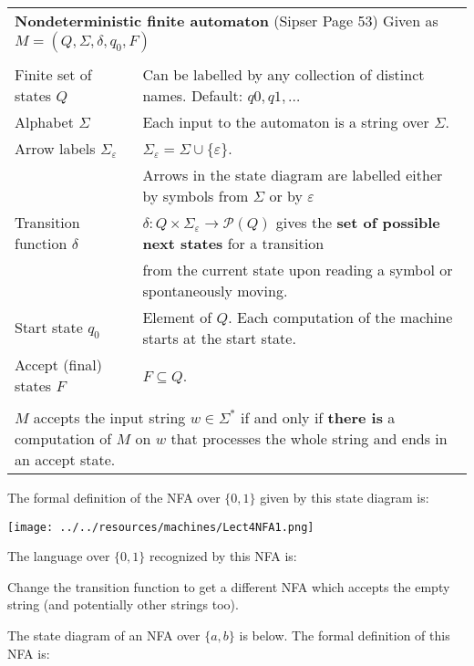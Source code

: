 \documentclass[12pt, oneside]{article}
\begin{document}
\begin{center}
\begin{tabular}{|ll|}
\hline
\multicolumn{2}{|l|}{{\bf Nondeterministic finite automaton}  (Sipser Page 53) Given as $M = (Q, \Sigma, \delta, q_0, F)$}\\
& \\
Finite set of states $Q$  & Can  be labelled by any collection  of distinct names. Default: $q0, q1, \ldots$  \\
Alphabet $\Sigma$ &  Each input to the automaton is a string over  $\Sigma$. \\
Arrow labels $\Sigma_\varepsilon$ &  $\Sigma_\varepsilon = \Sigma \cup \{ \varepsilon\}$. \\
&  Arrows 
in the state diagram are labelled either by symbols from $\Sigma$ or by $\varepsilon$ \\
Transition function $\delta$  & $\delta: Q \times \Sigma_{\varepsilon} \to \mathcal{P}(Q)$
gives the {\bf set of possible next states} for a transition \\
&  from the current state upon reading a symbol or spontaneously moving.\\
Start state $q_0$ & Element of $Q$.  Each computation of the machine starts at the  start  state.\\
Accept (final) states $F$ & $F \subseteq  Q$.\\
& \\
\multicolumn{2}{|p{\textwidth}|}{$M$ accepts the input string $w \in \Sigma^*$ if and only if {\bf there is} a computation of $M$ on 
$w$ that processes the whole string and ends in an
accept state.}\\
\hline
\end{tabular}
\end{center}

The formal definition of the NFA over $\{0,1\}$ given by this state diagram is: 

\texttt{[image: ../../resources/machines/Lect4NFA1.png]}

The language over $\{0,1\}$ recognized by this NFA is:

\vspace{70pt}

Change the transition function to get a different NFA which accepts
the empty string (and potentially other strings too).


\newpage

The state diagram of an NFA over $\{a,b\}$ is below.  The formal definition of this NFA is:
\end{document}
